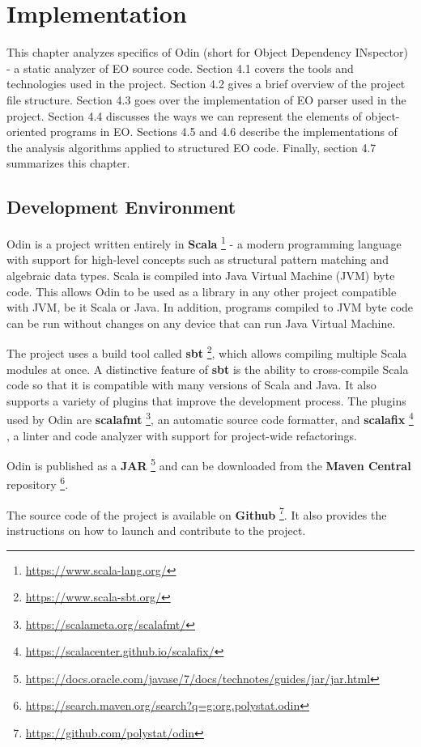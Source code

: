 \chapter{Implementation}
\label{chap:impl}
This chapter analyzes specifics of Odin (short for Object Dependency INspector) - a static analyzer of EO source code. Section 4.1 covers the tools and technologies used in the project. Section 4.2 gives a brief overview of the project file structure.
Section 4.3 goes over the implementation of EO parser used in the project. Section 4.4 discusses the ways we can represent the elements of object-oriented programs in EO. Sections 4.5 and 4.6 describe the implementations of the analysis algorithms applied to structured EO code. Finally, section 4.7 summarizes this chapter.

\section{Development Environment}
Odin is a project written entirely in \textbf{Scala} \footnote{\url{https://www.scala-lang.org/}} - a modern programming language with support for high-level concepts such as structural pattern matching and algebraic data types. Scala is compiled into Java Virtual Machine (JVM) byte code. This allows Odin to be used as a library in any other project compatible with JVM, be it Scala or Java. In addition, programs compiled to JVM byte code can be run without changes on any device that can run Java Virtual Machine.


The project uses a build tool called \textbf{sbt} \footnote{\url{https://www.scala-sbt.org/}}, which allows compiling multiple Scala modules at once. A distinctive feature of \textbf{sbt} is the ability to cross-compile Scala code so that it is compatible with many versions of Scala and Java. It also supports a variety of plugins that improve the development process. The plugins used by Odin are \textbf{scalafmt} \footnote{\url{https://scalameta.org/scalafmt/}}, an automatic source code formatter, and \textbf{scalafix} \footnote{\url{https://scalacenter.github.io/scalafix/}} , a linter and code analyzer with support for project-wide refactorings.

Odin is published as a \textbf{JAR} \footnote{\url{https://docs.oracle.com/javase/7/docs/technotes/guides/jar/jar.html}} and can be downloaded from the \textbf{Maven Central} repository \footnote{\url{https://search.maven.org/search?q=g:org.polystat.odin}}.

The source code of the project is available on \textbf{Github} \footnote{\url{https://github.com/polystat/odin}}. It also provides the instructions on how to launch and contribute to the project.



